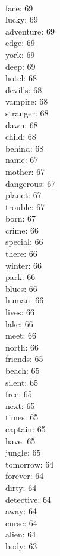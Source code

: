 \begin{multicols}{6}
  \\ face: 69
  \\ lucky: 69
  \\ adventure: 69
  \\ edge: 69
  \\ york: 69
  \\ deep: 69
  \\ hotel: 68
  \\ devil's: 68
  \\ vampire: 68
  \\ stranger: 68
  \\ dawn: 68
  \\ child: 68
  \\ behind: 68
  \\ name: 67
  \\ mother: 67
  \\ dangerous: 67
  \\ planet: 67
  \\ trouble: 67
  \\ born: 67
  \\ crime: 66
  \\ special: 66
  \\ there: 66
  \\ winter: 66
  \\ park: 66
  \\ blues: 66
  \\ human: 66
  \\ lives: 66
  \\ lake: 66
  \\ meet: 66
  \\ north: 66
  \\ friends: 65
  \\ beach: 65
  \\ silent: 65
  \\ free: 65
  \\ next: 65
  \\ times: 65
  \\ captain: 65
  \\ have: 65
  \\ jungle: 65
  \\ tomorrow: 64
  \\ forever: 64
  \\ dirty: 64
  \\ detective: 64
  \\ away: 64
  \\ curse: 64
  \\ alien: 64
  \\ body: 63

\end{multicols}
